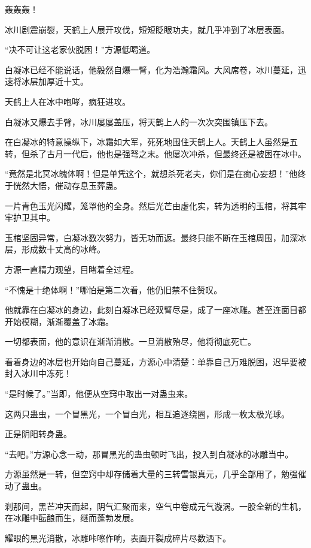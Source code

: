 
\begin{this_body}

轰轰轰！

冰川剧震崩裂，天鹤上人展开攻伐，短短眨眼功夫，就几乎冲到了冰层表面。

“决不可让这老家伙脱困！”方源低喝道。

白凝冰已经不能说话，他毅然自爆一臂，化为浩瀚霜风。大风席卷，冰川蔓延，迅速将冰层加厚近十丈。

天鹤上人在冰中咆哮，疯狂进攻。

白凝冰又爆去手臂，冰川屡屡盖压，将天鹤上人的一次次突围镇压下去。

在白凝冰的特意操纵下，冰霜如大军，死死地围住天鹤上人。天鹤上人虽然是五转，但杀了古月一代后，他也是强弩之末。他屡次冲杀，但最终还是被困在冰中。

“竟然是北冥冰魄体啊！但是单凭这个，就想杀死老夫，你们是在痴心妄想！”他终于恍然大悟，催动存息玉葬蛊。

一片青色玉光闪耀，笼罩他的全身。然后光芒由虚化实，转为透明的玉棺，将其牢牢护卫其中。

玉棺坚固异常，白凝冰数次努力，皆无功而返。最终只能不断在玉棺周围，加深冰层，形成数十丈高的冰峰。

方源一直精力观望，目睹着全过程。

“不愧是十绝体啊！”哪怕是第二次看，他仍旧禁不住赞叹。

他就靠在白凝冰的身边，此刻白凝冰已经双臂尽是，成了一座冰雕。甚至连面目都开始模糊，渐渐覆盖了冰霜。

一切都表面，他的意识在渐渐消散。一旦消散殆尽，他将彻底死亡。

看着身边的冰层也开始向自己蔓延，方源心中清楚：单靠自己万难脱困，迟早要被封入冰川中冻死！

“是时候了。”当即，他便从空窍中取出一对蛊虫来。

这两只蛊虫，一个冒黑光，一个冒白光，相互追逐绕圈，形成一枚太极光球。

正是阴阳转身蛊。

“去吧。”方源心念一动，那冒黑光的蛊虫顿时飞出，投入到白凝冰的冰雕当中。

方源虽然是一转，但空窍中却存储着大量的三转雪银真元，几乎全部用了，勉强催动了蛊虫。

刹那间，黑芒冲天而起，阴气汇聚而来，空气中卷成元气漩涡。一股全新的生机，在冰雕中酝酿而生，继而蓬勃发展。

耀眼的黑光消散，冰雕咔嚓作响，表面开裂成碎片尽数洒下。


\end{this_body}
